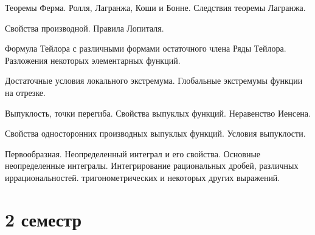 \documentclass[a4paper]{article}
\begin{document}
\begin{nums}{0}
\item Теоремы Ферма. Ролля, Лагранжа, Коши и Бонне. Следствия теоремы Лагранжа.
\item Свойства производной. Правила Лопиталя.
\item Формула Тейлора с различными формами остаточного члена Ряды Тейлора. Разложения некоторых элементарных функций.
\item Достаточные условия локального экстремума. Глобальные экстремумы функции на отрезке.
\item Выпуклость, точки перегиба. Свойства выпуклых функций. Неравенство Иенсена.
\item Свойства односторонних производных выпуклых функций. Условия выпуклости.
\item Первообразная. Неопределенный интеграл и его свойства. Основные
неопределенные интегралы. Интегрирование рациональных дробей, различных
иррациональностей. тригонометрических и некоторых других выражений.
\end{nums}


\section*{2 семестр}
\end{document}
